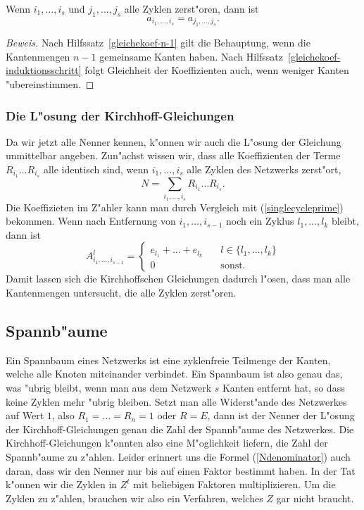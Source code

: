 \begin{satz}
Wenn $i_1,\dots,i_s$ und $j_1,\dots,j_s$ alle Zyklen zerst"oren,
dann ist 
\[
a_{i_1,\dots,i_s}=a_{j_1,\dots,j_s}.
\]
\end{satz}

\begin{proof}[Beweis]
Nach Hilfssatz~\ref{gleichekoef-n-1} gilt die Behauptung, wenn die Kantenmengen
$n-1$ gemeinsame Kanten haben.
Nach Hilfssatz~\ref{gleichekoef-induktionsschritt} folgt Gleichheit der
Koeffizienten auch, wenn weniger Kanten "ubereinstimmen.
\end{proof}

\subsubsection{Die L"osung der Kirchhoff-Gleichungen}
Da wir jetzt alle Nenner kennen, k"onnen wir auch die L"osung
der Gleichung unmittelbar angeben.
Zun"achst wissen wir, dass alle Koeffizienten der Terme
$R_{i_1}\dots R_{i_s}$ alle identisch sind, wenn $i_1,\dots,i_s$
alle Zyklen des Netzwerks zerst"ort,
\[
N =\sum_{i_1,\dots,i_s}R_{i_1}\dots R_{i_s}.
\]
Die Koeffizieten im Z"ahler kann man durch Vergleich
mit (\ref{singlecycleprime}) bekommen. Wenn nach Entfernung
von $i_1,\dots,i_{s-1}$ noch ein Zyklus $l_1,\dots,l_k$ bleibt, dann
ist
\[
A_{i_1,\dots,i_{s-1}}^l=\begin{cases}
e_{l_1}+\dots+e_{l_k}&\quad l\in\{l_1,\dots,l_k\}\\
0&\quad \text{sonst.}
\end{cases}
\]
Damit lassen sich die Kirchhoffschen Gleichungen dadurch l"osen,
dass man alle Kantenmengen untersucht, die alle Zyklen zerst"oren.

\subsection{Spannb"aume}
Ein Spannbaum eines Netzwerks ist eine zyklenfreie Teilmenge der Kanten,
welche alle Knoten miteinander verbindet.
Ein Spannbaum ist also genau das, was "ubrig bleibt, wenn man aus dem
Netzwerk $s$ Kanten entfernt hat, so dass keine Zyklen mehr "ubrig bleiben.
Setzt man alle Widerst"ande des Netzwerkes auf Wert $1$, also
$R_1=\dots=R_n=1$ oder $R=E$,
dann ist der Nenner der L"osung der Kirchhoff-Gleichungen
genau die Zahl der Spannb"aume des Netzwerkes. Die Kirchhoff-Gleichungen
k"onnten also eine M"oglichkeit liefern, die Zahl der Spannb"aume
zu z"ahlen. 
Leider erinnert uns die Formel (\ref{Ndenominator}) auch daran, dass  
wir den Nenner nur bis auf einen Faktor bestimmt haben. In der
Tat k"onnen wir die Zyklen in $Z^t$ mit beliebigen Faktoren
multiplizieren. Um die Zyklen zu z"ahlen, brauchen wir also
ein Verfahren, welches $Z$ gar nicht braucht.


